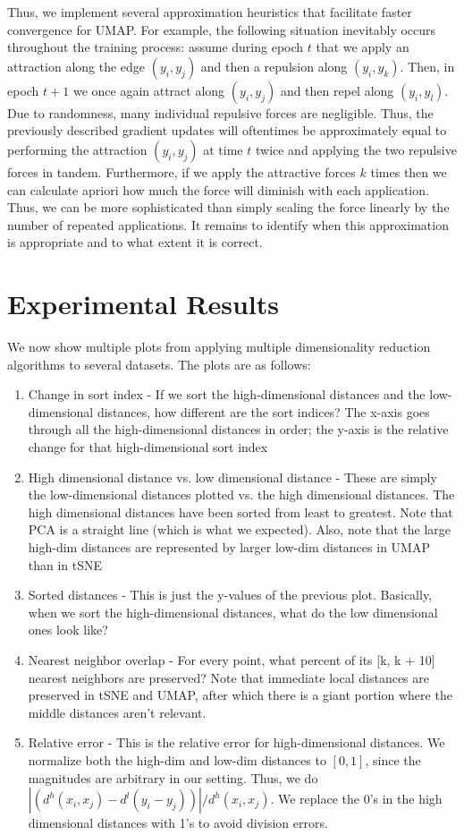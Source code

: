 \documentclass{article}
\theoremstyle{definition}
\begin{document}
\begin{multicols}{2}
Thus, we implement several approximation
heuristics that facilitate faster convergence for UMAP. For example, the following situation inevitably occurs throughout the training process: assume during
epoch $t$ that we apply an attraction along the edge $(y_i, y_j)$ and then a repulsion along $(y_i, y_k)$. Then, in epoch $t+1$ we once again attract along
$(y_i, y_j)$ and then repel along $(y_i, y_l)$. Due to randomness, many individual repulsive forces are negligible. Thus, the previously described gradient
updates will oftentimes be approximately equal to performing the attraction $(y_i, y_j)$ at time $t$ twice and applying the two repulsive forces in tandem.
Furthermore, if we apply the attractive forces $k$ times then we can calculate apriori how much the force will diminish with each application. Thus, we can be
more sophisticated than simply scaling the force linearly by the number of repeated applications. It remains to identify when this approximation is appropriate
and to what extent it is correct.

\section{Experimental Results}
We now show multiple plots from applying multiple dimensionality reduction algorithms to several datasets. The plots are as follows:
\begin{enumerate}
    \item Change in sort index - If we sort the high-dimensional distances and the low-dimensional distances, how different are the sort indices? The x-axis
        goes through all the high-dimensional distances in order; the y-axis is the relative change for that high-dimensional sort index
    \item High dimensional distance vs. low dimensional distance - These are simply the low-dimensional distances plotted vs. the high dimensional distances. The high dimensional distances
        have been sorted from least to greatest. Note that PCA is a straight line (which is what we expected). Also, note that the large high-dim distances are
        represented by larger low-dim distances in UMAP than in tSNE
    \item Sorted distances - This is just the y-values of the previous plot. Basically, when we sort the high-dimensional distances, what do the low
        dimensional ones look like?
    \item Nearest neighbor overlap - For every point, what percent of its [k, k + 10] nearest neighbors are preserved? Note that immediate local distances are preserved in
        tSNE and UMAP, after which there is a giant portion where the middle distances aren't relevant.
    \item Relative error - This is the relative error for high-dimensional distances. We normalize both the high-dim and low-dim distances to $[0, 1]$, since the
        magnitudes are arbitrary in our setting. Thus, we do $| (d^h(x_i, x_j) - d^l(y_i - y_j)) |/ d^h(x_i, x_j)$. We replace the 0's in the high dimensional
        distances with 1's to avoid division errors.
\end{enumerate}


\end{multicols}
\end{document}
